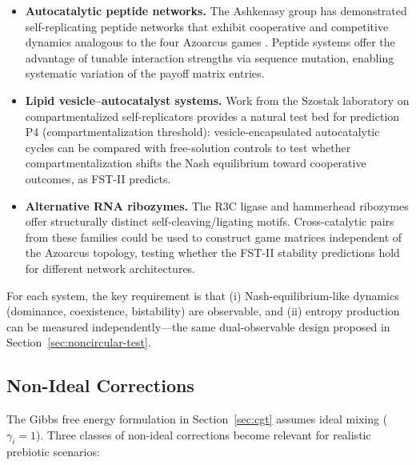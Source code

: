 \documentclass[12pt,a4paper]{article}
\theoremstyle{remark}
\begin{document}
\begin{itemize}
    \item \textbf{Autocatalytic peptide networks.} The Ashkenasy group has demonstrated self-replicating peptide networks that exhibit cooperative and competitive dynamics analogous to the four Azoarcus games \citep{Ashkenasy2004}. Peptide systems offer the advantage of tunable interaction strengths via sequence mutation, enabling systematic variation of the payoff matrix entries.
    \item \textbf{Lipid vesicle--autocatalyst systems.} Work from the Szostak laboratory on compartmentalized self-replicators \citep{Szostak2001} provides a natural test bed for prediction P4 (compartmentalization threshold): vesicle-encapsulated autocatalytic cycles can be compared with free-solution controls to test whether compartmentalization shifts the Nash equilibrium toward cooperative outcomes, as FST-II predicts.
    \item \textbf{Alternative RNA ribozymes.} The R3C ligase \citep{Rogers2001} and hammerhead ribozymes \citep{Hammerhead1986} offer structurally distinct self-cleaving/ligating motifs. Cross-catalytic pairs from these families could be used to construct game matrices independent of the Azoarcus topology, testing whether the FST-II stability predictions hold for different network architectures.
\end{itemize}

\noindent
For each system, the key requirement is that (i) Nash-equilibrium-like dynamics (dominance, coexistence, bistability) are observable, and (ii) entropy production can be measured independently---the same dual-observable design proposed in Section~\ref{sec:noncircular-test}.

\subsection{Non-Ideal Corrections}
\label{sec:nonideal-corrections}

The Gibbs free energy formulation in Section~\ref{sec:cgt} assumes ideal mixing ($\gamma_i = 1$). Three classes of non-ideal corrections become relevant for realistic prebiotic scenarios:
\end{document}
